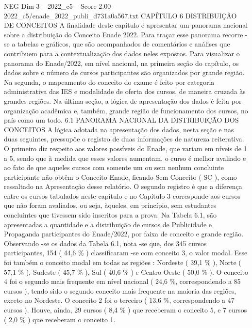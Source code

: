 \begin{textsample}{NEG Dim 3 – 2022\_c5 – Score 2.00 – 2022\_c5/enade\_2022\_publi\_d731a0a567.txt}  \label{ex:f3_neg_216}
CAPÍTULO 6 DISTRIBUIÇÃO DE CONCEITOS A finalidade deste capítulo é apresentar um panorama nacional sobre a distribuição do Conceito Enade 2022.
Para traçar esse panorama recorre -se a tabelas e gráficos, que são acompanhados de comentários e análises que contribuem para a contextualização dos dados neles expostos.
Para visualizar o panorama do Enade/2022, em nível nacional, na primeira seção do capítulo, os dados sobre o número de cursos participantes são organizados por grande região.
Na segunda, o mapeamento do conceito do exame é feito por categoria administrativa das IES e modalidade de oferta dos cursos, de maneira cruzada às grandes regiões.
Na última seção, a lógica de apresentação dos dados é feita por organização acadêmica e, também, grande região de funcionamento dos cursos, no país como um todo. 6.1 PANORAMA NACIONAL DA DISTRIBUIÇÃO DOS CONCEITOS A lógica adotada na apresentação dos dados, nesta seção e nas duas seguintes, pressupõe o registro de duas informações de natureza reiterativa.
O primeiro diz respeito aos valores possíveis do Enade, que variam em níveis de 1 a 5, sendo que à medida que esses valores aumentam, o curso é melhor avaliado e ao fato de que aqueles cursos com somente um ou sem nenhum concluinte participante não obtêm o Conceito Enade, ficando Sem Conceito ( SC ), como ressaltado na Apresentação desse relatório.
O segundo registro é que a diferença entre os cursos tabulados neste capítulo e no Capítulo 3 corresponde aos cursos que não foram avaliados, ou seja, àqueles, em princípio, sem estudantes concluintes que tivessem sido inscritos para a prova.
Na Tabela 6.1, são apresentadas a quantidade e a distribuição de cursos de Publicidade e Propaganda participantes do Enade/2022, por faixa de conceito e grande região.
Observando -se os dados da Tabela 6.1, nota -se que, dos 345 cursos participantes, 154 ( 44,6 \% ) classificaram -se com conceito 3, o valor modal.
Esse foi também o conceito modal em todas as regiões : Nordeste ( 39,1 \% ), Norte ( 57,1 \% ), Sudeste ( 45,7 \% ), Sul ( 40,6 \% ) e Centro-Oeste ( 50,0 \% ).
O conceito 4 foi o segundo mais frequente em nível nacional ( 24,6 \%, correspondendo a 85 cursos ), tendo sido o segundo conceito mais frequente na maioria das regiões, exceto no Nordeste.
O conceito 2 foi o terceiro ( 13,6 \%, correspondendo a 47 cursos ).
Houve, ainda, 29 cursos ( 8,4 \% ) que receberam o conceito 5, e 7 cursos ( 2,0 \% ) que receberam o conceito 1.

\end{textsample}
